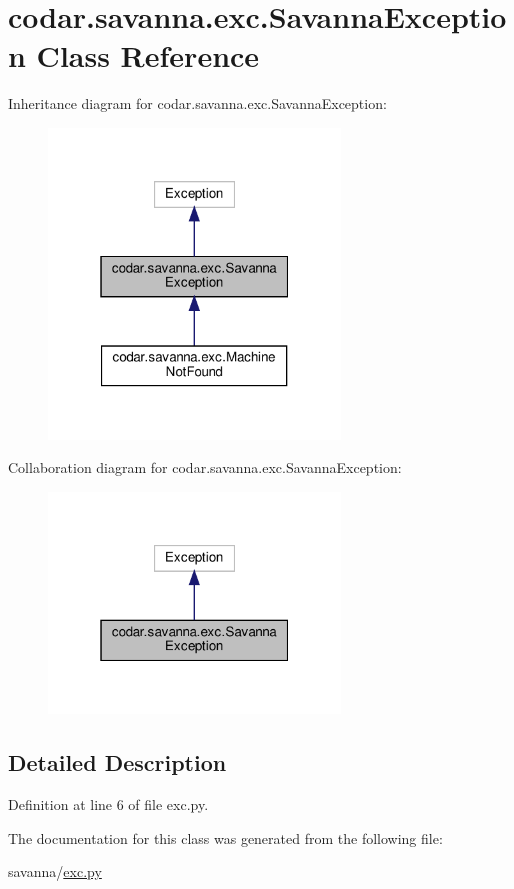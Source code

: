 \hypertarget{classcodar_1_1savanna_1_1exc_1_1_savanna_exception}{}\section{codar.\+savanna.\+exc.\+Savanna\+Exception Class Reference}
\label{classcodar_1_1savanna_1_1exc_1_1_savanna_exception}


Inheritance diagram for codar.\+savanna.\+exc.\+Savanna\+Exception\+:
\nopagebreak
\begin{figure}[H]
\begin{center}
\leavevmode
\includegraphics[width=220pt]{classcodar_1_1savanna_1_1exc_1_1_savanna_exception__inherit__graph}
\end{center}
\end{figure}


Collaboration diagram for codar.\+savanna.\+exc.\+Savanna\+Exception\+:
\nopagebreak
\begin{figure}[H]
\begin{center}
\leavevmode
\includegraphics[width=220pt]{classcodar_1_1savanna_1_1exc_1_1_savanna_exception__coll__graph}
\end{center}
\end{figure}


\subsection{Detailed Description}


Definition at line 6 of file exc.\+py.



The documentation for this class was generated from the following file\+:\begin{DoxyCompactItemize}
\item 
savanna/\hyperlink{savanna_2exc_8py}{exc.\+py}\end{DoxyCompactItemize}
